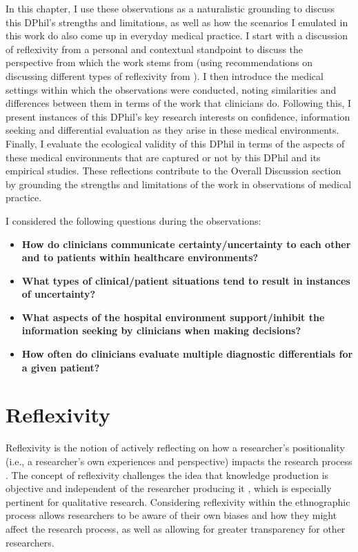 \documentclass[a4paper, nobind]{templates/ociamthesis}
\providecommand{\tightlist}{%
  \setlength{\itemsep}{0pt}\setlength{\parskip}{0pt}}
\begin{document}
\hfill\break
In this chapter, I use these observations as a naturalistic grounding to discuss this DPhil's strengths and limitations, as well as how the scenarios I emulated in this work do also come up in everyday medical practice. I start with a discussion of reflexivity from a personal and contextual standpoint to discuss the perspective from which the work stems from (using recommendations on discussing different types of reflexivity from \autocite{olmos-vega_practical_2023}). I then introduce the medical settings within which the observations were conducted, noting similarities and differences between them in terms of the work that clinicians do. Following this, I present instances of this DPhil's key research interests on confidence, information seeking and differential evaluation as they arise in these medical environments. Finally, I evaluate the ecological validity of this DPhil in terms of the aspects of these medical environments that are captured or not by this DPhil and its empirical studies. These reflections contribute to the Overall Discussion section by grounding the strengths and limitations of the work in observations of medical practice.

\hfill\break
I considered the following questions during the observations:

\begin{itemize}
\tightlist
\item
  \textbf{How do clinicians communicate certainty/uncertainty to each other and to patients within healthcare environments?}
\item
  \textbf{What types of clinical/patient situations tend to result in instances of uncertainty?}
\item
  \textbf{What aspects of the hospital environment support/inhibit the information seeking by clinicians when making decisions?}
\item
  \textbf{How often do clinicians evaluate multiple diagnostic differentials for a given patient?}
\end{itemize}

\section{Reflexivity}\label{reflexivity}

Reflexivity is the notion of actively reflecting on how a researcher's positionality (i.e., a researcher's own experiences and perspective) impacts the research process \autocite{lazard2020}. The concept of reflexivity challenges the idea that knowledge production is objective and independent of the researcher producing it \autocite{berger2015}, which is especially pertinent for qualitative research. Considering reflexivity within the ethnographic process allows researchers to be aware of their own biases and how they might affect the research process, as well as allowing for greater transparency for other researchers.\\
\end{document}
